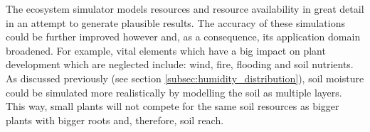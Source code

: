 The ecosystem simulator models resources and resource availability in great detail in an attempt to generate plausible results. The accuracy of these simulations could be further improved however and, as a consequence, its application domain broadened. For example, vital elements which have a big impact on plant development which are neglected include: wind, fire, flooding and soil nutrients.\\
As discussed previously (see section \ref{subsec:humidity_distribution}), soil moisture could be simulated more realistically by modelling the soil as multiple layers. This way, small plants will not compete for the same soil resources as bigger plants with bigger roots and, therefore, soil reach.\\ 
